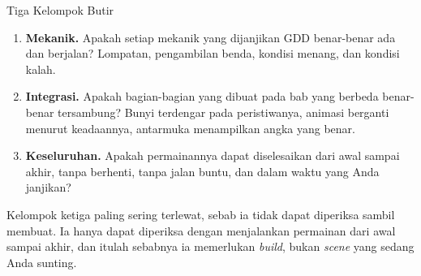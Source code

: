 \documentclass[aspectratio=169,10pt]{beamer}
\begin{document}
\begin{frame}{Tiga Kelompok Butir}
\begin{enumerate}
  \item \textbf{Mekanik.} Apakah setiap mekanik yang dijanjikan GDD benar-benar
        ada dan berjalan? Lompatan, pengambilan benda, kondisi menang, dan
        kondisi kalah.
  \item \textbf{Integrasi.} Apakah bagian-bagian yang dibuat pada bab yang
        berbeda benar-benar tersambung? Bunyi terdengar pada peristiwanya,
        animasi berganti menurut keadaannya, antarmuka menampilkan angka yang
        benar.
  \item \textbf{Keseluruhan.} Apakah permainannya dapat diselesaikan dari awal
        sampai akhir, tanpa berhenti, tanpa jalan buntu, dan dalam waktu yang
        Anda janjikan?
\end{enumerate}
\vspace{0.14cm}
\begin{kotak}
Kelompok ketiga paling sering terlewat, sebab ia tidak dapat diperiksa sambil
membuat. Ia hanya dapat diperiksa dengan menjalankan permainan dari awal sampai
akhir, dan itulah sebabnya ia memerlukan \emph{build}, bukan \emph{scene} yang
sedang Anda sunting.
\end{kotak}
\end{frame}
\end{document}
